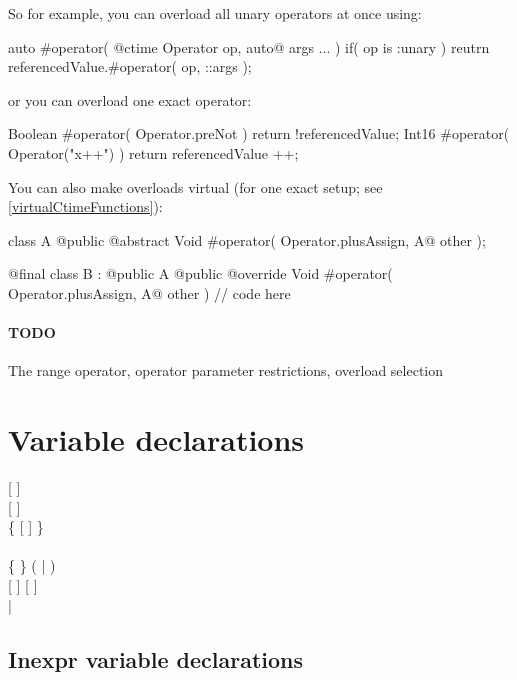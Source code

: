 So for example, you can overload all unary operators at once using:
\begin{code}
auto #operator( @ctime Operator op, auto@ args ... )
	if( op is :unary )
{
	reutrn referencedValue.#operator( op, ::args );
}
\end{code}

or you can overload one exact operator:
\begin{code}
Boolean #operator( Operator.preNot ) {
	return !referencedValue;	
}
Int16 #operator( Operator("x++") ) {
	return referencedValue ++;
}
\end{code}

You can also make overloads virtual (for one exact setup; see \ref{virtualCtimeFunctions}):
\begin{code}
class A {
	@public @abstract Void #operator( Operator.plusAssign, A@ other );
}

@final class B : @public A {
	@public @override Void #operator( Operator.plusAssign, A@ other ) {
		// code here	
	}
}
\end{code}

\paragraph{TODO} The range operator, operator parameter restrictions, overload selection

\section{Variable declarations}
\begin{grammar}
	   [  ] \\
	   [  ] \\
		\grLn \{ \kwd{,}  [  ] \} \kwd{;} \\
	\\
	 \{  \} (  |  ) \\
	  [  ] [ \kwd{!} ] \\
	  | \kwd{=}  \\
\end{grammar}

\subsection{Inexpr variable declarations}

